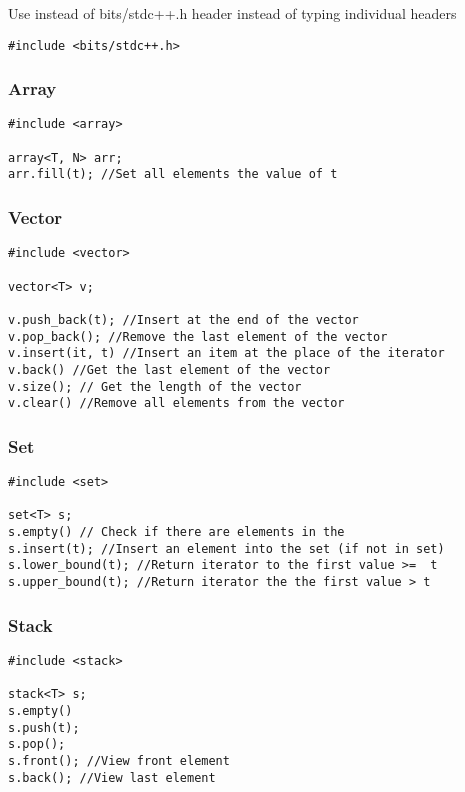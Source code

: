 Use  instead of bits/stdc++.h header instead of typing individual headers
\begin{lstlisting}[style=CStyle]
#include <bits/stdc++.h>
\end{lstlisting}


\subsubsection{Array}
\begin{lstlisting}[style=CStyle]
#include <array>

array<T, N> arr;
arr.fill(t); //Set all elements the value of t
\end{lstlisting}

\subsubsection{Vector}
\begin{lstlisting}[style=CStyle]
#include <vector>

vector<T> v;

v.push_back(t); //Insert at the end of the vector
v.pop_back(); //Remove the last element of the vector
v.insert(it, t) //Insert an item at the place of the iterator
v.back() //Get the last element of the vector
v.size(); // Get the length of the vector
v.clear() //Remove all elements from the vector
\end{lstlisting}

\clearpage

\subsubsection{Set}
\begin{lstlisting}[style=CStyle]
#include <set>

set<T> s;
s.empty() // Check if there are elements in the
s.insert(t); //Insert an element into the set (if not in set)
s.lower_bound(t); //Return iterator to the first value >=  t
s.upper_bound(t); //Return iterator the the first value > t
\end{lstlisting}

\subsubsection{Stack}
\begin{lstlisting}[style=CStyle]
#include <stack>

stack<T> s;
s.empty()
s.push(t);
s.pop();
s.front(); //View front element
s.back(); //View last element
\end{lstlisting}

